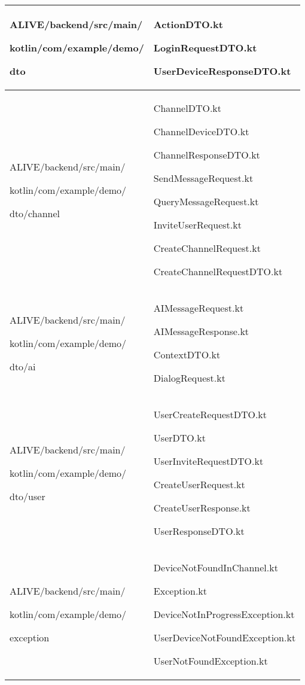 \documentclass[conference]{IEEEtran}
\begin{document}
\begin{table}[h!]
\begin{tabular}{|p{3.8cm}|p{4.3cm}|}
          ALIVE/backend/src/main/ \par kotlin/com/example/demo/ \par dto & ActionDTO.kt \par LoginRequestDTO.kt \par UserDeviceResponseDTO.kt \\ \hline

          ALIVE/backend/src/main/ \par kotlin/com/example/demo/ \par dto/channel & ChannelDTO.kt \par ChannelDeviceDTO.kt \par ChannelResponseDTO.kt \par SendMessageRequest.kt \par 
          QueryMessageRequest.kt \par 
          InviteUserRequest.kt \par 
          CreateChannelRequest.kt \par CreateChannelRequestDTO.kt \\ \hline

          ALIVE/backend/src/main/ \par kotlin/com/example/demo/ \par dto/ai & AIMessageRequest.kt \par AIMessageResponse.kt \par ContextDTO.kt \par DialogRequest.kt 
          \\ \hline

          
          ALIVE/backend/src/main/ \par kotlin/com/example/demo/ \par dto/user & UserCreateRequestDTO.kt \par UserDTO.kt \par UserInviteRequestDTO.kt \par CreateUserRequest.kt \par
          CreateUserResponse.kt \par
          UserResponseDTO.kt \\ \hline

          ALIVE/backend/src/main/ \par kotlin/com/example/demo/ \par exception & DeviceNotFoundInChannel.kt \par Exception.kt\par DeviceNotInProgressException.kt \par UserDeviceNotFoundException.kt \par UserNotFoundException.kt \\ \hline
          
	\end{tabular}
\end{table}
\end{document}
